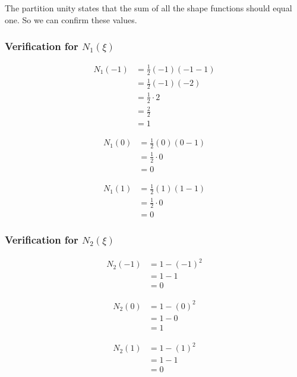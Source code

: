 \documentclass{article}
\begin{document}
The partition unity states that the sum of all the shape functions should equal one.
So we can confirm these values.

\subsubsection*{Verification for \( N_1(\xi) \)}

\begin{align*}
    N_1(-1) &= \frac{1}{2}(-1)(-1 - 1) \\
            &= \frac{1}{2}(-1)(-2) \\
            &= \frac{1}{2} \cdot 2 \\
            &= \frac{2}{2} \\
            &= 1
\end{align*}

\begin{align*}
    N_1(0) &= \frac{1}{2}(0)(0 - 1) \\
           &= \frac{1}{2} \cdot 0 \\
           &= 0
\end{align*}

\begin{align*}
    N_1(1) &= \frac{1}{2}(1)(1 - 1) \\
           &= \frac{1}{2} \cdot 0 \\
           &= 0
\end{align*}

\subsubsection*{Verification for \( N_2(\xi) \)}

\begin{align*}
    N_2(-1) &= 1 - (-1)^2 \\
            &= 1 - 1 \\
            &= 0
\end{align*}

\begin{align*}
    N_2(0) &= 1 - (0)^2 \\
           &= 1 - 0 \\
           &= 1
\end{align*}

\begin{align*}
    N_2(1) &= 1 - (1)^2 \\
           &= 1 - 1 \\
           &= 0
\end{align*}
\end{document}
